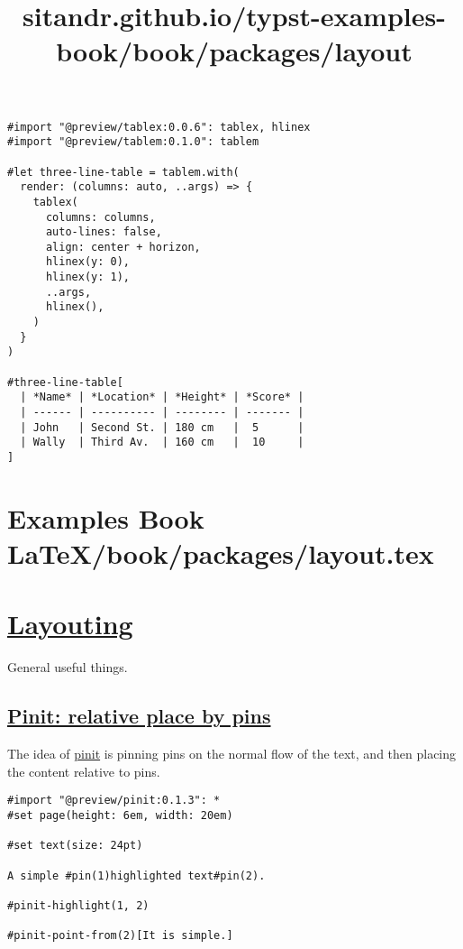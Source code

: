 \begin{verbatim}
#import "@preview/tablex:0.0.6": tablex, hlinex
#import "@preview/tablem:0.1.0": tablem

#let three-line-table = tablem.with(
  render: (columns: auto, ..args) => {
    tablex(
      columns: columns,
      auto-lines: false,
      align: center + horizon,
      hlinex(y: 0),
      hlinex(y: 1),
      ..args,
      hlinex(),
    )
  }
)

#three-line-table[
  | *Name* | *Location* | *Height* | *Score* |
  | ------ | ---------- | -------- | ------- |
  | John   | Second St. | 180 cm   |  5      |
  | Wally  | Third Av.  | 160 cm   |  10     |
]
\end{verbatim}

\pandocbounded{}


\section{Examples Book LaTeX/book/packages/layout.tex}
\title{sitandr.github.io/typst-examples-book/book/packages/layout}

\section{\texorpdfstring{\hyperref[layouting]{Layouting}}{Layouting}}\label{layouting}

General useful things.

\subsection{\texorpdfstring{\hyperref[pinit-relative-place-by-pins]{Pinit:
relative place by
pins}}{Pinit: relative place by pins}}\label{pinit-relative-place-by-pins}

The idea of \href{https://github.com/OrangeX4/typst-pinit}{pinit} is
pinning pins on the normal flow of the text, and then placing the
content relative to pins.

\begin{verbatim}
#import "@preview/pinit:0.1.3": *
#set page(height: 6em, width: 20em)

#set text(size: 24pt)

A simple #pin(1)highlighted text#pin(2).

#pinit-highlight(1, 2)

#pinit-point-from(2)[It is simple.]
\end{verbatim}

